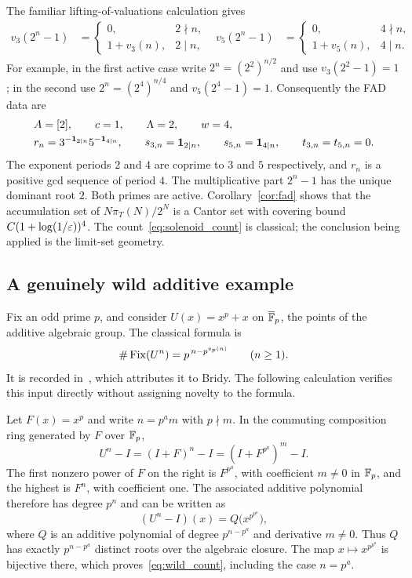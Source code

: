 The familiar lifting-of-valuations calculation gives
\begin{align*}
 v_3(2^n-1)&=\begin{cases}0,&2\nmid n,\\1+v_3(n),&2\mid n,\end{cases}
 &
 v_5(2^n-1)&=\begin{cases}0,&4\nmid n,\\1+v_5(n),&4\mid n.\end{cases}
\end{align*}
For example, in the first active case write $2^n=(2^2)^{n/2}$ and use
$v_3(2^2-1)=1$; in the second use $2^n=(2^4)^{n/4}$ and
$v_5(2^4-1)=1$. Consequently the FAD data are
\begin{align}
 &A=[2],\qquad c=1,\qquad \Lambda=2,\qquad w=4,\notag\\
 &r_n=3^{-\mathbf 1_{2\mid n}}5^{-\mathbf 1_{4\mid n}},\qquad
 s_{3,n}=\mathbf 1_{2\mid n},\qquad s_{5,n}=\mathbf 1_{4\mid n},\qquad
 t_{3,n}=t_{5,n}=0.\label{eq:solenoid_data}
\end{align}
The exponent periods $2$ and $4$ are coprime to $3$ and $5$ respectively,
and $r_n$ is a positive gcd sequence of period $4$. The multiplicative
part $2^n-1$ has the unique dominant root $2$. Both primes are active.
Corollary~\ref{cor:fad} shows that the accumulation set of
$N\pi_T(N)/2^N$ is a Cantor set with covering bound
$C(1+\log(1/\varepsilon))^4$. The count~\eqref{eq:solenoid_count} is classical;
the conclusion being applied is the limit-set geometry.

\subsection{A genuinely wild additive example}

Fix an odd prime $p$, and consider $U(x)=x^p+x$ on
$\overline{\mathbb F}_p$, the points of the additive algebraic group.
The classical formula is
\begin{equation}\label{eq:wild_count}
 \#\operatorname{Fix}(U^n)=p^{\,n-p^{v_p(n)}}
 \qquad(n\geq1).
\end{equation}
It is recorded in~\cite[Example 7.2.7]{bch2024}, which attributes it to
Bridy. The following calculation verifies this input directly without
assigning novelty to the formula.

Let $F(x)=x^p$ and write $n=p^a m$ with $p\nmid m$. In the commuting
composition ring generated by $F$ over $\mathbb F_p$,
\[
 U^n-I=(I+F)^n-I=(I+F^{p^a})^m-I.
\]
The first nonzero power of $F$ on the right is $F^{p^a}$, with coefficient
$m\neq0$ in $\mathbb F_p$, and the highest is $F^n$, with coefficient one.
The associated additive polynomial therefore has degree $p^n$ and can
be written as
\[
 (U^n-I)(x)=Q\bigl(x^{p^{p^a}}\bigr),
\]
where $Q$ is an additive polynomial of degree $p^{n-p^a}$ and derivative
$m\neq0$. Thus $Q$ has exactly $p^{n-p^a}$ distinct roots over the
algebraic closure. The map $x\mapsto x^{p^{p^a}}$ is bijective there,
which proves~\eqref{eq:wild_count}, including the case $n=p^a$.

